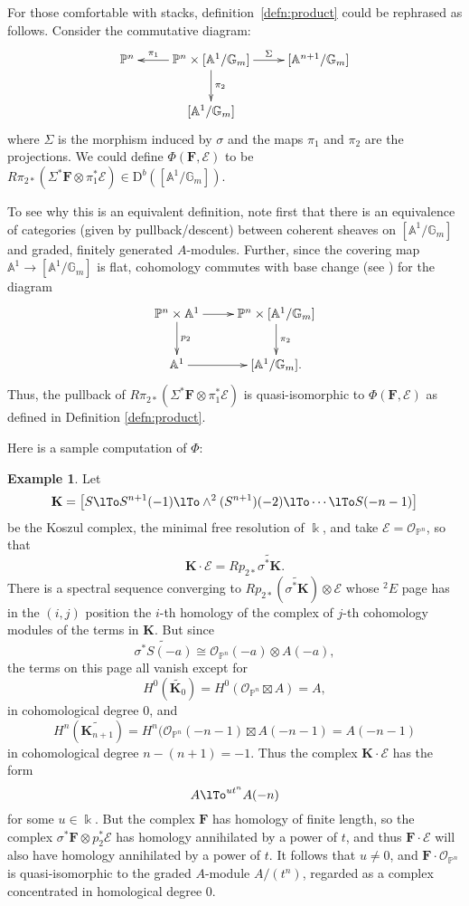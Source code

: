 \documentclass[12pt]{amsart}
\theoremstyle{definition}
\newtheorem{example}[lemma]{Example}
\theoremstyle{remark}
\newcommand{\Spec}{\operatorname{Spec}}
\newcommand{\kk}{\Bbbk}
\newcommand{\PP}{\mathbb{P}}
\renewcommand{\AA}{\mathbb{A}}
\newcommand{\GG}{\mathbb{G}}
\newcommand{\cO}{\mathcal{O}}
\newcommand{\cE}{\mathcal{E}}
\newcommand{\bK}{\mathbf{K}}
\newcommand{\FF}{\mathbf{F}}
\newcommand{\DD}{\mathrm{D}}
\begin{document}
For those comfortable with stacks, definition~\ref{defn:product}
could be rephrased as follows. Consider the commutative diagram:
\[
\xymatrix{
\PP^n&\PP^{n}\times [\AA^1/\GG_m]\ar[l]_-{\pi_{1}} \ar[r]^-{\Sigma} \ar[d]^{\pi_2}&[\AA^{n+1}/\GG_m]\\
&[\AA^1/\GG_m]&%
}
\]
where $\Sigma$ is the morphism induced by $\sigma$ and the maps $\pi_1$ and $\pi_2$ are the projections.  We could define $\Phi(\FF,\cE)$ to be $R\pi_{2*}\left( \Sigma^*\FF\otimes \pi_{1}^{*}\cE\right)\in \DD^b([\AA^1/\GG_m])$.

To see why this is an equivalent definition, note first  that there is an equivalence of categories (given by pullback/descent) between coherent sheaves on $[\AA^1/\GG_m]$ and graded, finitely generated $A$-modules. Further, since the covering map $\AA^1\to [\AA^1/\GG_m]$ is flat, cohomology commutes with base change (see \cite[0765]{stacks-project}) for the diagram
\[
\xymatrix{
\PP^n\times \AA^1\ar[r]\ar[d]^-{p_2}&\PP^{n}\times [\AA^1/\GG_m]\ar[d]^{\pi_2}\\
\AA^1\ar[r]&[\AA^1/\GG_m].
}
\]
Thus, the pullback of $R\pi_{2*}\left( \Sigma^*\FF\otimes \pi_{1}^{*}\cE\right)$ is quasi-isomorphic 
to $\Phi(\FF,\cE)$ as defined in Definition \ref{defn:product}.

Here is a sample computation of $\Phi$: 

\begin{example} Let 
$$
\bK = \bigl[ S\lTo S^{n+1}(-1) \lTo \wedge^{2}(S^{n+1})(-2) \lTo\cdots\lTo S(-n-1)\bigr]
$$
be the Koszul complex, the minimal free resolution of $\kk$, and take
$\cE = \cO_{\PP^{n}}$, so that 
$$
\bK \cdot \cE = Rp_{2*}\widetilde {\sigma^{*}\bK}.
$$  
There is a spectral sequence converging to $Rp_{2*}(\widetilde {\sigma^{*}\bK})\otimes \cE$
whose $^{2}E$ page has in the $(i,j)$ position the $i$-th homology of the complex
of $j$-th cohomology modules of the terms in $\bK$. But since
$$
\widetilde {\sigma^{*} S(-a)} \cong \cO_{\PP^{n}}(-a)\otimes A(-a),
$$
the terms on this page all vanish except for
$$
H^{0} (\widetilde{\bK_{0}}) = H^{0}(\cO_{\PP^{n}}\boxtimes A) = A,
$$
in cohomological degree 0, and 
$$
H^{n}(\widetilde{\bK_{n+1}}) = H^{n}(\cO_{\PP^{n}}(-n-1)\boxtimes A(-n-1) = A(-n-1)
$$
in cohomological degree $n-(n+1) = -1$.
Thus the complex $\bK \cdot \cE$ has the form
$$
A\lTo^{ut^{n}}A(-n)
$$
for some $u\in \kk$. But the complex $\FF$ has homology of finite length, so the complex $\sigma^{*}\FF \otimes p_{2}^{*}\cE$ has homology annihilated by a power of $t$, and thus $\FF\cdot \cE$ will also have homology annihilated by a power of $t$. It follows that $u\neq 0$, and $\FF\cdot \cO_{\PP^{n}}$ is quasi-isomorphic to the graded $A$-module $A/(t^{n})$, regarded as a complex concentrated in homological degree 0.
\end{example}
\end{document}
